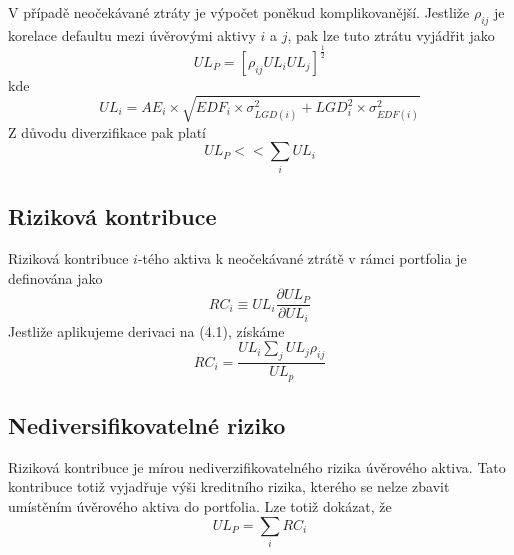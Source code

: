 V případě neočekávané ztráty je výpočet poněkud komplikovanější. Jestliže $\rho_{ij}$ je korelace defaultu mezi úvěrovými aktivy $i$ a $j$, pak lze tuto ztrátu vyjádřit jako
\begin{equation}
UL_P = \left[\rho_{ij} UL_i UL_j \right]^{\frac{1}{2}}
\end{equation}
kde
\begin{equation*}
UL_i = AE_i \times \sqrt{EDF_i \times \sigma_{LGD(i)}^2 + LGD_i^2 \times \sigma_{EDF(i)}^2}
\end{equation*}
Z důvodu diverzifikace pak platí
\begin{equation*}
UL_P << \sum_i UL_i
\end{equation*}

\subsection{Riziková kontribuce}

Riziková kontribuce $i$-tého aktiva k neočekávané ztrátě v rámci portfolia je definována jako
\begin{equation*}
RC_i \equiv UL_i \frac{\partial UL_P}{\partial UL_i}
\end{equation*}
Jestliže aplikujeme derivaci na (4.1), získáme
\begin{equation*}
RC_i = \frac{UL_i \sum_j UL_j \rho_{ij}}{UL_p}
\end{equation*}

\subsection{Nediversifikovatelné riziko}

Riziková kontribuce je mírou nediverzifikovatelného rizika úvěrového aktiva. Tato kontribuce totiž vyjadřuje výši kreditního rizika, kterého se nelze zbavit umístěním úvěrového aktiva do portfolia. Lze totiž dokázat, že
\begin{equation*}
UL_P = \sum_i RC_i
\end{equation*}

